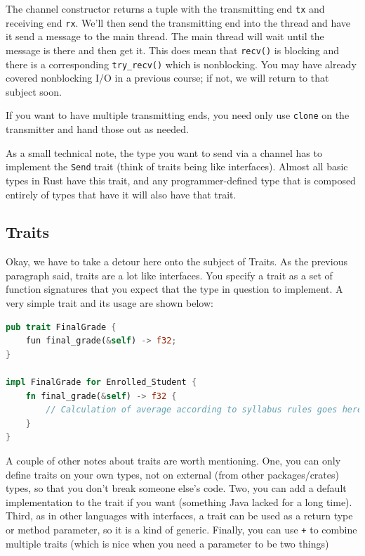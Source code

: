 \documentclass[a4paper]{report}
\begin{document}
The channel constructor returns a tuple with the transmitting end \texttt{tx} and receiving end \texttt{rx}. We'll then send the transmitting end into the thread and have it send a message to the main thread. The main thread will wait until the message is there and then get it. This does mean that \texttt{recv()} is blocking and there is a corresponding \texttt{try\_recv()} which is nonblocking. You may have already covered nonblocking I/O in a previous course; if not, we will return to that subject soon.

If you want to have multiple transmitting ends, you need only use \texttt{clone} on the transmitter and hand those out as needed. 

As a small technical note, the type you want to send via a channel has to implement the \texttt{Send} trait (think of traits being like interfaces). Almost all basic types in Rust have this trait, and any programmer-defined type that is composed entirely of types that have it will also have that trait.  


\subsection*{Traits}
Okay, we have to take a detour here onto the subject of Traits. As the previous paragraph said, traits are a lot like interfaces. You specify a trait as a set of function signatures that you expect that the type in question to implement. A very simple trait and its usage are shown below:

\begin{lstlisting}[language=Rust]
pub trait FinalGrade {
	fun final_grade(&self) -> f32;
}

impl FinalGrade for Enrolled_Student {
    fn final_grade(&self) -> f32 {
        // Calculation of average according to syllabus rules goes here
    }	
}  
\end{lstlisting}

A couple of other notes about traits are worth mentioning. One, you can only define traits on your own types, not on external (from other packages/crates) types, so that you don't break someone else's code. Two, you can add a default implementation to the trait if you want (something Java lacked for a long time). Third, as in other languages with interfaces, a trait can be used as a return type or method parameter, so it is a kind of generic. Finally, you can use \texttt{+} to combine multiple traits (which is nice when you need a parameter to be two things)
\end{document}
